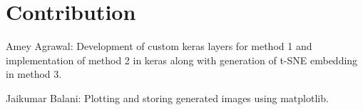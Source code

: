 \documentclass{article} %
\begin{document}
\section{Contribution}
Amey Agrawal:
Development of custom keras layers for method 1 and implementation of method 2 in
keras along with generation of t-SNE embedding in method 3.

Jaikumar Balani:
Plotting and storing generated images using matplotlib.



\end{document}
